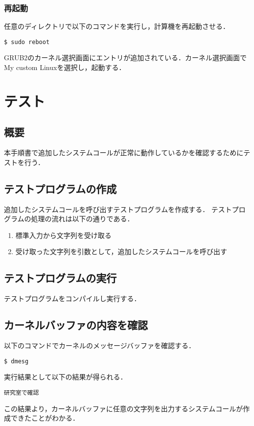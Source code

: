 \documentclass[12pt]{jsarticle}
\begin{document}
\subsubsection{再起動}
任意のディレクトリで以下のコマンドを実行し，計算機を再起動させる．
\begin{verbatim}
$ sudo reboot
\end{verbatim}
GRUB2のカーネル選択画面にエントリが追加されている．カーネル選択画面でMy custom Linuxを選択し，起動する．

\section{テスト}
\subsection{概要}
本手順書で追加したシステムコールが正常に動作しているかを確認するためにテストを行う．

\subsection{テストプログラムの作成}
追加したシステムコールを呼び出すテストプログラムを作成する．
テストプログラムの処理の流れは以下の通りである．
\begin{enumerate}
\item 標準入力から文字列を受け取る
\item 受け取った文字列を引数として，追加したシステムコールを呼び出す 
\end{enumerate}
\subsection{テストプログラムの実行}
テストプログラムをコンパイルし実行する．

\subsection{カーネルバッファの内容を確認}
以下のコマンドでカーネルのメッセージバッファを確認する．
\begin{verbatim}
$ dmesg
\end{verbatim}
実行結果として以下の結果が得られる．
\begin{verbatim}
研究室で確認
\end{verbatim}
この結果より，カーネルバッファに任意の文字列を出力するシステムコールが作成できたことがわかる．
\end{document}
